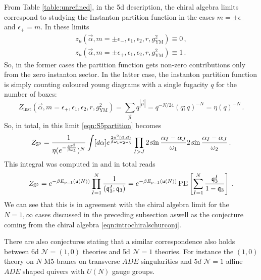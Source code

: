 \documentclass[main.tex]{subfiles}
\begin{document}
From Table \ref{table:unrefined}, in the 5d description, the chiral algebra limits correspond to studying the Instanton partition function in the cases $m=\pm\epsilon_-$ and $\epsilon_+=m$.  In these limits
\begin{gather}
z_{\mu}(\vec{\alpha},m=\pm\epsilon_-,\epsilon_1,\epsilon_2,r,g_{\text{YM}}^2)\equiv0\,,\\ z_{\mu}(\vec{\alpha},m=\pm\epsilon_+,\epsilon_1,\epsilon_2,r,g_{\text{YM}}^2)\equiv1\,.
\end{gather}
So, in the former cases the partition function gets non-zero contributions only from the zero instanton sector.  In the latter case, the instanton partition function is simply counting coloured young diagrams with a single fugacity $q$ for the number of boxes:
\begin{equation}
Z_{\text{inst}}\left(\vec{\alpha},m=\epsilon_+,\epsilon_1,\epsilon_2,r,g^2_{\text{YM}}\right)=\sum_{\vec{\mu}} q^{|\vec{\mu}|}=q^{-N/24}(q;q)^{-N}=\eta(q)^{-N}\,.
\end{equation} 
So, in total, in this limit \eqref{eqn:S5partition} becomes
\begin{equation}
Z_{\mathbb{S}^5}=\frac{1}{\eta(e^{-\frac{4\pi^2}{\beta\omega_3}})^N}\int[d\alpha]e^{\frac{2\pi^2(\vec{\alpha},\vec{\alpha})}{\beta\omega_1\omega_2\omega_3}}\prod_{I>J}2\sin\frac{\alpha_I-\alpha_J}{\omega_1}2\sin\frac{\alpha_I-\alpha_J}{\omega_2}\,.
\end{equation}
This integral was computed in \cite{Kim:2013nva} and in total reads
\begin{equation}\label{eqn:chiralalg6dlim}
Z_{\mathbb{S}^5}=e^{-\beta E_{p=1}(\mathfrak{u}(N))}\prod_{I=1}^N\frac{1}{(\mathfrak{q}_3^I;\mathfrak{q}_3)}=e^{-\beta E_{p=1}(\mathfrak{u}(N))}\operatorname{\mathrm{PE}}\left[\sum_{I=1}^N\frac{\mathfrak{q}_3^I}{1-\mathfrak{q}_3}\right]\,.
\end{equation}
We can see that this is in agreement with the chiral algebra limit for the $N=1,\infty$ cases discussed in the preceding subsection aswell as the conjecture coming from the chiral algebra \eqref{eqn:introchiralschurconj}.

There are also conjectures stating that a similar correspondence also holds between 6d $\mathcal{N}=(1,0)$ theories and 5d $\mathcal{N}=1$ theories.  For instance the $(1,0)$ theory on $N$ M5-branes on transverse $ADE$ singularities and $5d$ $\mathcal{N}=1$ affine $ADE$ shaped quivers with $U(N)$ gauge groups.    
\end{document}
